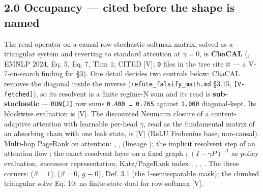 \documentclass[11pt,a4paper]{article}
\theoremstyle{plain}
\theoremstyle{definition}
\theoremstyle{remark}
\begin{document}
\subsection{2.0 Occupancy --- cited before the shape is
named}\label{occupancy-cited-before-the-shape-is-named}

The read operator on a causal row-stochastic softmax matrix, solved as a
triangular system and reverting to standard attention at \(\gamma = 0\),
is \textbf{ChaCAL} (\citep{fagnou-2024-chacal}, EMNLP 2024, Eq. 5, Eq.
7, Thm 1; CITED {[}V{]}; \texttt{0} files in the tree cite it --- a
V-7-on-search finding for §3). One detail decides two controls below:
ChaCAL removes the diagonal inside the inverse
(\texttt{refute\_falsify\_math.md} §3.15, \texttt{{[}V-fetched{]}}), so
its resolvent is a finite regime-N sum and its read is
\textbf{sub-stochastic} --- \texttt{RUN{[}J{]}} row sums
\texttt{0.400\ …\ 0.765} against \texttt{1.000} diagonal-kept. Its
blockwise evaluation is \citep{zhao-2026-structuredsparse} {[}V{]}. The
discounted Neumann closure of a content-adaptive attention with
learnable per-head \(\gamma\), read as the fundamental matrix of an
absorbing chain with one leak state, is \citep{roffo-2026-infsa} {[}V{]}
(ReLU Frobenius base, non-causal). Multi-hop PageRank on attention:
\citep{wang-2021-magna}, \citep{feng-2022-diffuser},
\citep{yuan-2025-paraformer} (lineage \citep{chien-2020-gprgnn}); the
implicit resolvent step of an attention flow
\citep{chamberlain-2021-grand}; the exact resolvent layer on a fixed
graph \citep{gasteiger-2019-appnp}; \((I-\gamma P)^{-1}\) as policy
evaluation, successor representation, Katz/PageRank index
\citep{bellman-1957-markovian}, \citep{dayan-1993-successor},
\citep{katz-1953-status}, \citep{brin-1998-anatomy}. The three corners:
\citep{vaswani-2017-attention} (\(\beta=1\)),
\citep{katharopoulos-2020-linearattention} (\(\beta=0\), \(g\equiv0\)),
\citep{dao-2024-ssd} Def. 3.1 (the 1-semiseparable mask); the chunked
triangular solve \citep{yang-2024-deltanet} Eq. 10; no finite-state dual
for row-softmax \citep{hu-2025-ssdtheory} {[}V{]}.
\end{document}
